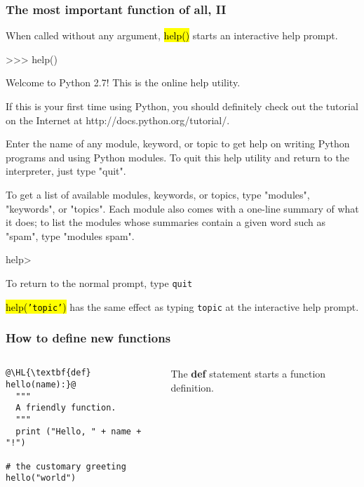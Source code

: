 \documentclass[english,serif,mathserif,xcolor=pdftex,dvipsnames,table]{beamer}
\begin{document}
\begin{frame}
  \frametitle{The most important function of all, II}

  When called without any argument, \hl{help()} starts an interactive
  help prompt.

  \+
  \begin{semiverbatim}\tiny
>>> help()

Welcome to Python 2.7!  This is the online help utility.

If this is your first time using Python, you should definitely check out
the tutorial on the Internet at http://docs.python.org/tutorial/.

Enter the name of any module, keyword, or topic to get help on writing
Python programs and using Python modules.  To quit this help utility and
return to the interpreter, just type "quit".

To get a list of available modules, keywords, or topics, type "modules",
"keywords", or "topics".  Each module also comes with a one-line summary
of what it does; to list the modules whose summaries contain a given word
such as "spam", type "modules spam".

help> 
\end{semiverbatim}

  \+
  To return to the normal prompt, type \texttt{quit}

  \+ 
  \hl{help(\texttt{'topic'})} has the same effect as typing
  \texttt{topic} at the interactive help prompt.
\end{frame}

\begin{frame}[fragile]
  \frametitle{How to define new functions}
  \begin{columns}[t]
    \begin{column}{0.5\textwidth}
\begin{lstlisting}
@\HL{\textbf{def} hello(name):}@
  """
  A friendly function.
  """
  print ("Hello, " + name + "!")

# the customary greeting
hello("world")
\end{lstlisting}
    \end{column}
    \begin{column}{0.5\textwidth}
      \raggedleft 
      The \textbf{def} statement starts a function definition.
    \end{column}
  \end{columns}
\end{frame}
\end{document}
